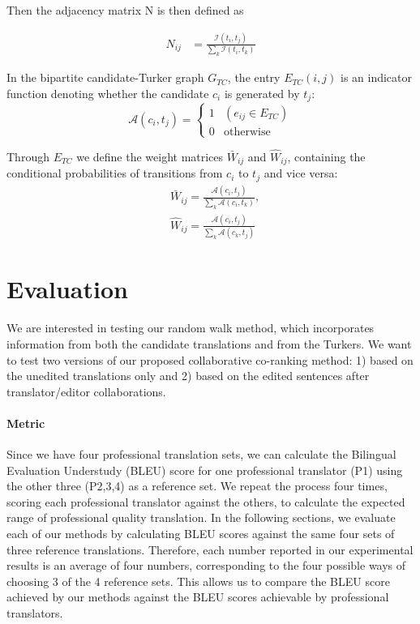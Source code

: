 \documentclass[11pt]{article}
\begin{document}
Then the adjacency matrix N is then defined as

\begin{equation}
\begin{aligned}
N_{ij}&=\frac{\mathcal{I}(t_i,t_j)}{\sum_k \mathcal{I}(t_i,t_k)}
\end{aligned}
\end{equation}

In the bipartite candidate-Turker graph $G_{TC}$, the entry $E_{TC}(i, j)$ is an indicator function denoting whether the candidate $c_i$ is generated by $t_j$:
\begin{equation}
\mathcal{A}(c_i,t_j)=
\begin{cases}
1 &(e_{ij} \in E_{TC}) \\
0 &\text{otherwise}
\end{cases}
\end{equation}

Through $E_{TC}$ we define the weight matrices $\bar{W}_{ij}$ and $\hat{W}_{ij}$, containing the conditional probabilities of transitions from $c_i$ to $t_j$ and vice versa:
\begin{equation}
\begin{aligned}
&\bar{W}_{ij}=\frac{\mathcal{A}(c_i,t_j)}{\sum_k \mathcal{A}(c_i,t_k)},\\
&\hat{W}_{ij}=\frac{\mathcal{A}(c_i,t_j)}{\sum_k \mathcal{A}(c_k,t_j)}
\end{aligned}
\end{equation}

\section{Evaluation}

We are interested in testing our random walk method, which incorporates information from both the candidate translations and from the Turkers. We want to test two versions of our proposed collaborative co-ranking method: 1) based on the unedited translations only and 2) based on the edited sentences after translator/editor collaborations.

\paragraph{Metric} Since we have four professional translation sets, we can calculate the Bilingual Evaluation Understudy (BLEU) score \cite{a17} for one professional translator (P1) using the other three (P2,3,4) as a reference set. We repeat the process four times, scoring each professional translator against the others, to calculate the expected range of professional quality translation. In the following sections, we evaluate each of our methods by calculating BLEU scores against the same four sets of three reference translations. Therefore, each number reported in our experimental results is an average of four numbers, corresponding to the four possible ways of choosing 3 of the 4 reference sets. This allows us to compare the BLEU score achieved by our methods against the BLEU scores achievable by professional translators.
\end{document}
